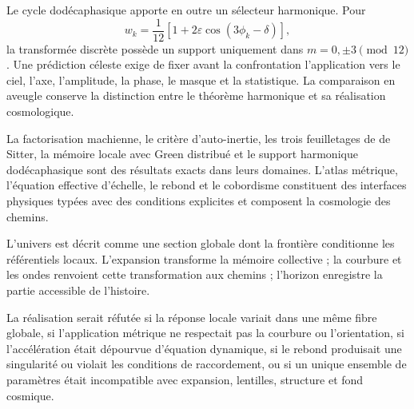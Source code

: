 Le cycle dodécaphasique apporte en outre un sélecteur harmonique. Pour
\[
 w_k=\frac1{12}
 \left[1+2\varepsilon\cos(3\phi_k-\delta)\right],
\]
la transformée discrète possède un support uniquement dans
\(m=0,\pm3\pmod{12}\). Une prédiction céleste exige de fixer avant la confrontation
l'application vers le ciel, l'axe, l'amplitude, la phase, le masque et la statistique.
La comparaison en aveugle conserve la distinction entre le théorème harmonique et sa
réalisation cosmologique.

\begin{resultado}
La factorisation machienne, le critère d'auto-inertie, les trois feuilletages
de de Sitter, la mémoire locale avec Green distribué et le support harmonique
dodécaphasique sont des résultats exacts dans leurs domaines. L'atlas métrique,
l'équation effective d'échelle, le rebond et le cobordisme constituent des interfaces
physiques typées avec des conditions explicites et composent la cosmologie des chemins.
\end{resultado}

\begin{lecturafisica}
L'univers est décrit comme une section globale dont la frontière conditionne les
référentiels locaux. L'expansion transforme la mémoire collective ; la courbure et
les ondes renvoient cette transformation aux chemins ; l'horizon enregistre la
partie accessible de l'histoire.
\end{lecturafisica}

\begin{frontera}
La réalisation serait réfutée si la réponse locale variait dans une
même fibre globale, si l'application métrique ne respectait pas la courbure ou l'orientation,
si l'accélération était dépourvue d'équation dynamique, si le rebond produisait une
singularité ou violait les conditions de raccordement, ou si un unique ensemble de
paramètres était incompatible avec expansion, lentilles, structure et fond
cosmique.
\end{frontera}
